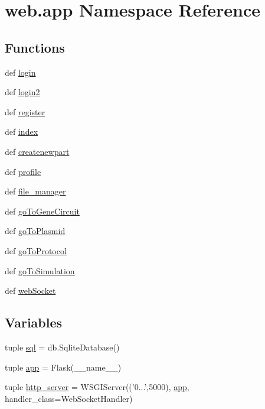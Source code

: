 \hypertarget{namespaceweb_1_1app}{\section{web.\-app Namespace Reference}
\label{namespaceweb_1_1app}
}
\subsection*{Functions}
\begin{DoxyCompactItemize}
\item 
def \hyperlink{namespaceweb_1_1app_a745eb8a6a27921d6b6f0c36171947c6a}{login}
\item 
def \hyperlink{namespaceweb_1_1app_aedcdaf9c61d02a85fd921fece14f6e2d}{login2}
\item 
def \hyperlink{namespaceweb_1_1app_aaf3029fa60f9d204f822a812acc3cd3f}{register}
\item 
def \hyperlink{namespaceweb_1_1app_ab56469f5a1f1579065b0cbde7c0e1d4d}{index}
\item 
def \hyperlink{namespaceweb_1_1app_a40f920d36965bc0ebc41198c36b87162}{createnewpart}
\item 
def \hyperlink{namespaceweb_1_1app_aa4559272475523124795f65a3c7abd90}{profile}
\item 
def \hyperlink{namespaceweb_1_1app_af189a0dd865383be88bdd72f47ce6c63}{file\-\_\-manager}
\item 
def \hyperlink{namespaceweb_1_1app_ad7949280ec79613530213b8d2302f1ef}{go\-To\-Gene\-Circuit}
\item 
def \hyperlink{namespaceweb_1_1app_adbd2056d68024a369f805011c2db7df0}{go\-To\-Plasmid}
\item 
def \hyperlink{namespaceweb_1_1app_adcb0184364a9086336883613f7472a4a}{go\-To\-Protocol}
\item 
def \hyperlink{namespaceweb_1_1app_a740f34edf85bd465bd51f11de052abc1}{go\-To\-Simulation}
\item 
def \hyperlink{namespaceweb_1_1app_a34159e10360d50f53a0c07971688e454}{web\-Socket}
\end{DoxyCompactItemize}
\subsection*{Variables}
\begin{DoxyCompactItemize}
\item 
tuple \hyperlink{namespaceweb_1_1app_a53f0a841bb2a563afe0e1b27884ce7e2}{sql} = db.\-Sqlite\-Database()
\item 
tuple \hyperlink{namespaceweb_1_1app_af49b9ed96516aeb4dd570f3ed9f98826}{app} = Flask(\-\_\-\-\_\-name\-\_\-\-\_\-)
\item 
tuple \hyperlink{namespaceweb_1_1app_ac8a4afaed9ae7354427e4f68517e1bb6}{http\-\_\-server} = W\-S\-G\-I\-Server(('0...',5000), \hyperlink{namespaceweb_1_1app_af49b9ed96516aeb4dd570f3ed9f98826}{app}, handler\-\_\-class=Web\-Socket\-Handler)
\end{DoxyCompactItemize}


